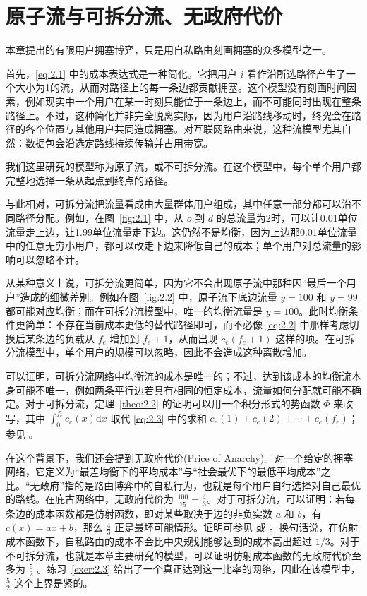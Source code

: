 \section{原子流与可拆分流、无政府代价}\label{sec-2.6}本章提出的有限用户拥塞博弈，只是用自私路由刻画拥塞的众多模型之一。

首先，\eqref{eq:2.1} 中的成本表达式是一种简化。它把用户 \(i\) 看作沿所选路径产生了一个大小为1的流，从而对路径上的每一条边都贡献拥塞。这个模型没有刻画时间因素，例如现实中一个用户在某一时刻只能位于一条边上，而不可能同时出现在整条路径上。不过，这种简化并非完全脱离实际，因为用户沿路线移动时，终究会在路径的各个位置与其他用户共同造成拥塞。对互联网路由来说，这种流模型尤其自然：数据包会沿选定路线持续传输并占用带宽。

我们这里研究的模型称为原子流，或不可拆分流。在这个模型中，每个单个用户都完整地选择一条从起点到终点的路径。

与此相对，可拆分流把流量看成由大量群体用户组成，其中任意一部分都可以沿不同路径分配。例如，在图~\ref{fig:2.1} 中，从 \(o\) 到 \(d\) 的总流量为2时，可以让0.01单位流量走上边，让1.99单位流量走下边。这仍然不是均衡，因为上边那0.01单位流量中的任意无穷小用户，都可以改走下边来降低自己的成本；单个用户对总流量的影响可以忽略不计。

从某种意义上说，可拆分流更简单，因为它不会出现原子流中那种因“最后一个用户”造成的细微差别。例如在图~\ref{fig:2.2} 中，原子流下底边流量 \(y = {100}\) 和 \(y = {99}\) 都可能对应均衡；而在可拆分流模型中，唯一的均衡流量是 \(y = {100}\)。此时均衡条件更简单：不存在当前成本更低的替代路径即可，而不必像 \eqref{eq:2.2} 中那样考虑切换后某条边的负载从 \({f}_{e}\) 增加到 \({f}_{e}+1\)，从而出现 \({c}_{e}\left( {{f}_{e} + 1}\right)\) 这样的项。在可拆分流模型中，单个用户的规模可以忽略，因此不会造成这种离散增加。

可以证明，可拆分流网络中均衡流的成本是唯一的；不过，达到该成本的均衡流本身可能不唯一，例如两条平行边若具有相同的恒定成本，流量如何分配就可能不确定。对于可拆分流，定理~\ref{theo:2.2} 的证明可以用一个积分形式的势函数 \(\Phi\) 来改写，其中 \({\int }_{0}^{{f}_{e}}{c}_{e}\left( x\right) \mathrm{d}x\) 取代 \eqref{eq:2.3} 中的求和 \({c}_{e}\left( 1\right)  + {c}_{e}\left( 2\right)  + \cdots  + {c}_{e}\left( {f}_{e}\right)\)；参见 \citet[Section~13.2.2]{roughgarden2016}。

在这个背景下，我们还会提到无政府代价(Price of Anarchy)。对一个给定的拥塞网络，它定义为“最差均衡下的平均成本”与“社会最优下的最低平均成本”之比。“无政府”指的是路由博弈中的自私行为，也就是每个用户自行选择对自己最优的路线。在庇古网络中，无政府代价为 \(\frac{100}{75} = \frac{4}{3}\)。对于可拆分流，可以证明：若每条边的成本函数都是仿射函数，即对某些取决于边的非负实数 \(a\) 和 \(b\)，有 \(c\left( x\right)  = {ax} + b\)，那么 \(\frac{4}{3}\) 正是最坏可能情形。证明可参见 \citet[Theorem~4.5]{roughgarden2002} 或 \citet[Chapter~11]{roughgarden2016}。换句话说，在仿射成本函数下，自私路由的成本不会比中央规划能够达到的成本高出超过 \(1/3\)。对于不可拆分流，也就是本章主要研究的模型，可以证明仿射成本函数的无政府代价至多为 \(\frac{5}{2}\) \citep[Theorem~12.3]{roughgarden2016}。练习~\ref{exer:2.3} 给出了一个真正达到这一比率的网络，因此在该模型中，\(\frac{5}{2}\) 这个上界是紧的。

